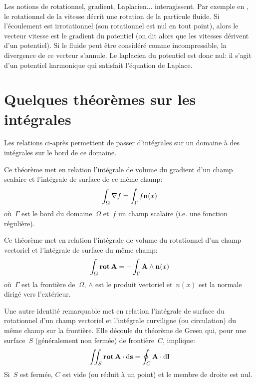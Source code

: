 \bigskip
Les notions de rotationnel, gradient, Laplacien... interagissent. Par exemple en , le rotationnel de la vitesse décrit une rotation de la particule fluide.
Si l'écoulement est irrotationnel (son rotationnel est nul en tout point), alors le vecteur vitesse est le gradient du potentiel (on dit alors que les vitesses dérivent d'un potentiel).
Si le fluide peut être considéré comme incompressible, la divergence de ce vecteur s'annule.
Le laplacien du potentiel est donc nul: il s'agit d'un potentiel harmonique qui satisfait l'équation de Laplace.

\medskip
\section{Quelques théorèmes sur les intégrales}

Les relations ci-après permettent de passer d'intégrales sur un domaine à des intégrales sur le bord de ce domaine.


\medskip
\begin{theoreme}
Ce théorème met en relation l'intégrale de volume du gradient d'un champ scalaire et l'intégrale de surface de ce même champ:
 \begin{equation}
  \int_\Omega \nabla f = \int_\Gamma f \mathbf{n}(x)
\end{equation}
où~$\Gamma$ est le bord du domaine~$\Omega$ et~$f$ un champ scalaire (i.e. une fonction régulière).
\end{theoreme}

\medskip
\begin{theoreme}
Ce théorème met en relation l'intégrale de volume du rotationnel d'un champ vectoriel et l'intégrale de surface du même champ:
\begin{equation}
\int_\Omega \operatorname{\mathbf{rot}} \mathbf{A} =
-\int_\Gamma \mathbf{A} \wedge \mathbf{n}(x)
\end{equation}
où~$\Gamma$ est la frontière de~$\Omega$, $\wedge$ est le produit vectoriel et~$n(x)$ est la normale dirigé vers l'extérieur.
\end{theoreme}

\medskip{}
Une autre identité remarquable met en relation l'intégrale de surface du rotationnel d'un champ vectoriel et l'intégrale curviligne (ou circulation) du même champ sur la frontière.
Elle découle du théorème de Green qui, pour une surface~$S$ (généralement non fermée) de frontière~$C$, implique:
\begin{equation}
\iint_S \operatorname{\mathbf{rot}} \mathbf{A} \cdot \text{d}\mathbf{s} = \oint_C \mathbf{A} \cdot \text{d}\mathbf{l}
\end{equation}
Si~$S$ est fermée, $C$ est vide (ou réduit à un point) et le membre de droite est nul.

